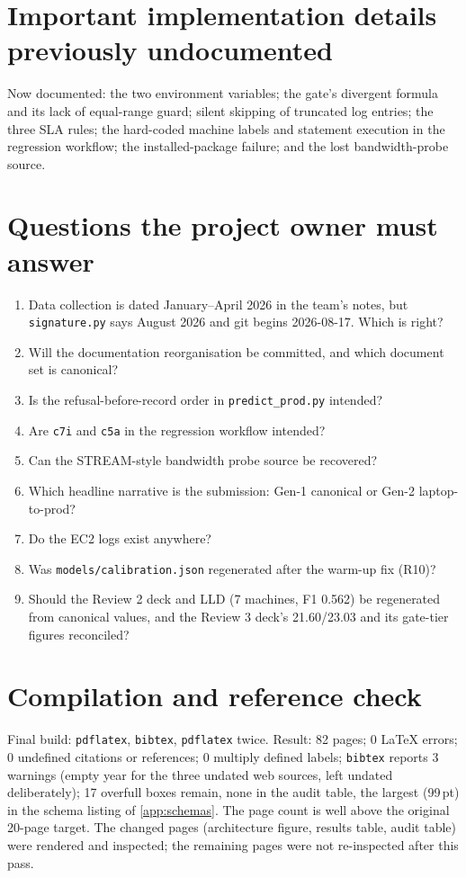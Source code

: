 \section{Important implementation details previously undocumented}
Now documented: the two environment variables; the gate's divergent formula and its lack of equal-range guard; silent skipping of truncated log entries; the three SLA rules; the hard-coded machine labels and statement execution in the regression workflow; the installed-package failure; and the lost bandwidth-probe source.

\section{Questions the project owner must answer}
\begin{enumerate}
\item Data collection is dated January--April 2026 in the team's notes, but \texttt{signature.py} says August 2026 and git begins 2026-08-17. Which is right?
\item Will the documentation reorganisation be committed, and which document set is canonical?
\item Is the refusal-before-record order in \texttt{predict\_prod.py} intended?
\item Are \texttt{c7i} and \texttt{c5a} in the regression workflow intended?
\item Can the STREAM-style bandwidth probe source be recovered?
\item Which headline narrative is the submission: Gen-1 canonical or Gen-2 laptop-to-prod?
\item Do the EC2 logs exist anywhere?
\item Was \texttt{models/calibration.json} regenerated after the warm-up fix (R10)?
\item Should the Review 2 deck and LLD (7 machines, F1 0.562) be regenerated from canonical values, and the Review 3 deck's 21.60/23.03 and its gate-tier figures reconciled?
\end{enumerate}

\section{Compilation and reference check}
Final build: \texttt{pdflatex}, \texttt{bibtex}, \texttt{pdflatex} twice. Result: 82 pages; 0 LaTeX errors; 0 undefined citations or references; 0 multiply defined labels; \texttt{bibtex} reports 3 warnings (empty year for the three undated web sources, left undated deliberately); 17 overfull boxes remain, none in the audit table, the largest (99\,pt) in the schema listing of \cref{app:schemas}. The page count is well above the original 20-page target. The changed pages (architecture figure, results table, audit table) were rendered and inspected; the remaining pages were not re-inspected after this pass.
